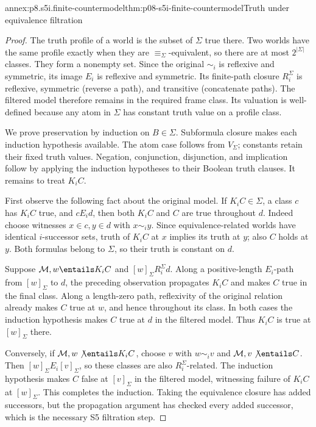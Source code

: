 \begin{annexitem}{annex:p8.s5i.finite-countermodel}{thm:p08-s5i-finite-countermodel}{Truth under equivalence filtration}
\begin{proof}
The truth profile of a world is the subset of \(\Sigma\) true there.
Two worlds have the same profile exactly when they are
\(\equiv_\Sigma\)-equivalent, so there are at most
\(2^{\lvert\Sigma\rvert}\) classes. They form a nonempty set. Since
the original \(\sim_i\) is reflexive and symmetric, its image
\(E_i\) is reflexive and symmetric. Its finite-path closure
\(R_i^\Sigma\) is reflexive, symmetric (reverse a path), and
transitive (concatenate paths). The filtered model therefore remains in
the required frame class. Its valuation is well-defined because any atom
in \(\Sigma\) has constant truth value on a profile class.

We prove preservation by induction on \(B\in\Sigma\). Subformula
closure makes each induction hypothesis available. The atom case follows
from \(V_\Sigma\); constants retain their fixed truth values. Negation,
conjunction, disjunction, and implication follow by applying the induction
hypotheses to their Boolean truth clauses. It remains to treat \(K_iC\).

First observe the following fact about the original model. If
\(K_iC\in\Sigma\), a class \(c\) has \(K_iC\) true, and
\(cE_i d\), then both \(K_iC\) and \(C\) are true throughout
\(d\). Indeed choose witnesses \(x\in c,y\in d\) with
\(x\sim_i y\). Since equivalence-related worlds have identical
\(i\)-successor sets, truth of \(K_iC\) at \(x\) implies its
truth at \(y\); also \(C\) holds at \(y\). Both formulas belong
to \(\Sigma\), so their truth is constant on \(d\).

Suppose \(\mathcal M,w\entails K_iC\) and
\([w]_\Sigma R_i^\Sigma d\). Along a positive-length \(E_i\)-path
from \([w]_\Sigma\) to \(d\), the preceding observation propagates
\(K_iC\) and makes \(C\) true in the final class. Along a
length-zero path, reflexivity of the original relation already makes
\(C\) true at \(w\), and hence throughout its class. In both cases
the induction hypothesis makes \(C\) true at \(d\) in the filtered
model. Thus \(K_iC\) is true at \([w]_\Sigma\) there.

Conversely, if \(\mathcal M,w\not\entails K_iC\), choose
\(v\) with \(w\sim_i v\) and \(\mathcal M,v\not\entails C\).
Then \([w]_\Sigma E_i[v]_\Sigma\), so these classes are also
\(R_i^\Sigma\)-related. The induction hypothesis makes \(C\) false
at \([v]_\Sigma\) in the filtered model, witnessing failure of
\(K_iC\) at \([w]_\Sigma\). This completes the induction. Taking
the equivalence closure has added successors, but the propagation argument
has checked every added successor, which is the necessary S5 filtration
step.


\end{proof}
\end{annexitem}
